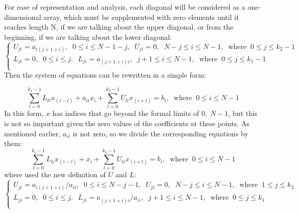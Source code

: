 \documentclass{article}
\begin{document}
For ease of representation and analysis, each diagonal will be considered as a one-dimensional array, which must be supplemented with zero elements until it reaches length N, if we are talking about the upper diagonal, or from the beginning, if we are talking about the lower diagonal:
\begin{equation}
\begin{cases}
    U_{ji} = a_{i (j + 1 + i)}, \;\; 0 \leq i \leq N - 1 - j, \;\; U_{ji} = 0, \;\; N - j  \leq i \leq N-1, \;\;\text{where} \;\; 0 \leq j \leq k_2-1  \\
    L_{ji} = 0, \;\; 0 \leq i \leq j, \;\; L_{ji} = a_{(j + 1 + i) i}, \;\; j + 1 \leq i \leq N - 1, \;\;\text{where} \;\; 0 \leq j \leq k_1-1  \\
\end{cases}
\end{equation}
Then the system of equations can be rewritten in a simple form:

\begin{equation}
    \sum_{l = 0}^{k_1 - 1} L_{li} x_{(i-l)} + a_{ii} x_{i} + \sum_{l = 0}^{k_2 - 1} U_{li} x_{(i+l)} = b_i, \;\;\text{where} \;\; 0 \leq i \leq N-1
\end{equation}
In this form, $x$ has indices that go beyond the formal limits of $0,\; N-1$, but this is not so important given the zero values of the coefficients at these points. As mentioned earlier, $a_{ii}$ is not zero, so we divide the corresponding equations by them:
\begin{equation}\label{4}
    \sum_{l = 0}^{k_1 - 1} L_{li} x_{(i-l)}  + x_{i} + \sum_{l = 0}^{k_2 - 1} U_{li} x_{(i+l)} = b_i, \;\;\text{where} \;\; 0 \leq i \leq N-1
\end{equation}
where used the new definition of $U$ and $L$:
\begin{equation}
\begin{cases}
    U_{ji} = a_{i (j + 1 + i)} / a_{ii}, \;\; 0 \leq i \leq N - j - 1, \;\; U_{ji} = 0, \;\; N - j \leq i \leq N-1, \;\;\text{where} \;\; 1 \leq j \leq k_2  \\
    L_{ji} = 0, \;\; 0 \leq i \leq j, \;\; L_{ji} = a_{(j + 1 + i) i} / a_{ii}, \;\; j + 1 \leq i \leq N - 1, \;\;\text{where} \;\; 0 \leq j \leq k_1  \\
\end{cases}
\end{equation}
\end{document}
